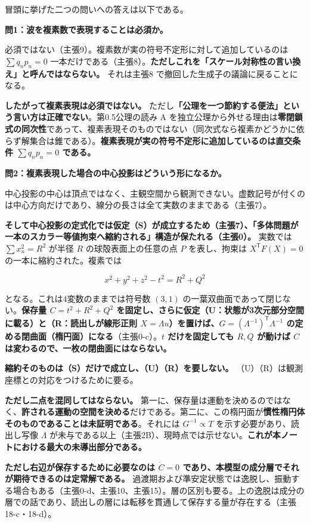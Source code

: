 \documentclass[
  10pt,
]{ltjsarticle}
\begin{document}
冒頭に挙げた二つの問いへの答えは以下である。

\textbf{問1：波を複素数で表現することは必須か。}

必須ではない（主張9）。複素数が実の符号不定形に対して追加しているのは
\(\sum q_np_n = 0\)
一本だけである（主張8）。\textbf{ただしこれを「スケール対称性の言い換え」と呼んではならない。}
それは主張8 で撤回した生成子の議論に戻ることになる。

\textbf{したがって複素表現は必須ではない。}
ただし\textbf{「公理を一つ節約する便法」という言い方は正確でない}。第0.5公理の読み
A
を独立公理から外せる理由は\textbf{零閉鎖式の同次性}であって、複素表現そのものではない（同次式なら複素かどうかに依らず解集合は錐である）。\textbf{複素表現が実の符号不定形に追加しているのは直交条件
\(\sum q_np_n = 0\) である。}

\textbf{問2：複素表現した場合の中心投影はどういう形になるか。}

中心投影の中心は頂点ではなく、主観空間から観測できない。虚数記号が付くのは中心方向だけであり、線分の長さは全て実数のままである（主張7）。

\textbf{そして中心投影の定式化では仮定（S）が成立するため（主張7）、「多体問題が一本のスカラー等値拘束へ縮約される」構造が保たれる（主張0）。}
実数では \(\sum x_n^2 = R^2\) が半径 \(R\) の球殻表面上の任意の点 \(P\)
を表し、拘束は \(X^{\mathsf T}F(X) = 0\) の一本に縮約された。複素では

\[x^2 + y^2 + z^2 - t^2 = R^2 + Q^2\]

となる。これは4変数のままでは符号数 \((3,1)\)
の一葉双曲面であって閉じない。\textbf{保存量 \(C = t^2+R^2+Q^2\)
を固定し、さらに仮定（U：状態が3次元部分空間に載る）と（R：読出しが線形正則
\(X = \Lambda u\)）を置けば、\(G = (\Lambda^{-1})^{\mathsf T}\Lambda^{-1}\)
の定める閉曲面（楕円面）になる}（主張0-c）。\textbf{\(t\)
だけを固定しても \(R, Q\) が動けば \(C\)
は変わるので、一枚の閉曲面にはならない。}

\textbf{縮約そのものは（S）だけで成立し、（U）（R）を要しない。}
（U）（R）は観測座標との対応をつけるために要る。

\textbf{ただし二点を混同してはならない。}
第一に、保存量は運動を決めるのではなく、\textbf{許される運動の空間を決める}だけである。第二に、この楕円面が\textbf{慣性楕円体そのものであることは未証明である}。それには
\(G^{-1}\propto T\) を示す必要があり、読出し写像 \(\Lambda\)
が未与である以上（主張2B）、現時点では示せない。\textbf{これが本ノートにおける最大の未導出部分である。}

\textbf{ただし右辺が保存するために必要なのは \(\dot C=0\)
であり、本模型の成分層でそれが期待できるのは定常解である。}
過渡期および準安定状態では逸脱し、振動する場合もある（主張0-d、主張10、主張15）。層の区別も要る。上の逸脱は成分の層での話であり、読出しの層には転移を貫通して保存する量が存在する（主張18-c・18-d）。
\end{document}
